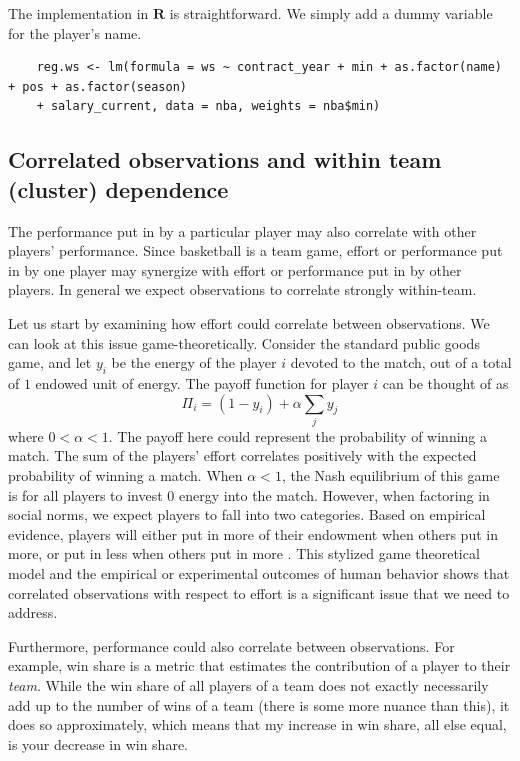 \documentclass[12pt]{article}
\begin{document}
	The implementation in $\textbf{R}$ is straightforward. We simply add a dummy variable for the player's name.
	
	\begin{lstlisting}
	reg.ws <- lm(formula = ws ~ contract_year + min + as.factor(name) + pos + as.factor(season) 
	+ salary_current, data = nba, weights = nba$min)
	\end{lstlisting}
	
	\subsection{Correlated observations and within team (cluster) dependence}
	
	The performance put in by a particular player may also correlate with other players' performance. Since basketball is a team game, effort or performance put in by one player may synergize with effort or performance put in by other players. In general we expect observations to correlate strongly within-team.
	
	Let us start by examining how effort could correlate between observations. We can look at this issue game-theoretically. Consider the standard public goods game, and let $y_i$ be the energy of the player $i$ devoted to the match, out of a total of $1$ endowed unit of energy. The payoff function for player $i$ can be thought of as \[
	\Pi_i = \left(1 - y_i\right) + \alpha \sum_{j} y_j
	\] where $0<\alpha<1$. The payoff here could represent the probability of winning a match. The sum of the players' effort correlates positively with the expected probability of winning a match. When $\alpha<1$, the Nash equilibrium of this game is for all players to invest $0$ energy into the match. However, when factoring in social norms, we expect players to fall into two categories. Based on empirical evidence, players will either put in more of their endowment when others put in more, or put in less when others put in more \citep{dong_dynamics_2016}. This stylized game theoretical model and the empirical or experimental outcomes of human behavior shows that correlated observations with respect to effort is a significant issue that we need to address.
	
	Furthermore, performance could also correlate between observations. For example, win share is a metric that estimates the contribution of a player to their \emph{team}. While the win share of all players of a team does not exactly necessarily add up to the number of wins of a team (there is some more nuance than this), it does so approximately, which means that my increase in win share, all else equal, is your decrease in win share.
	
\end{document}
